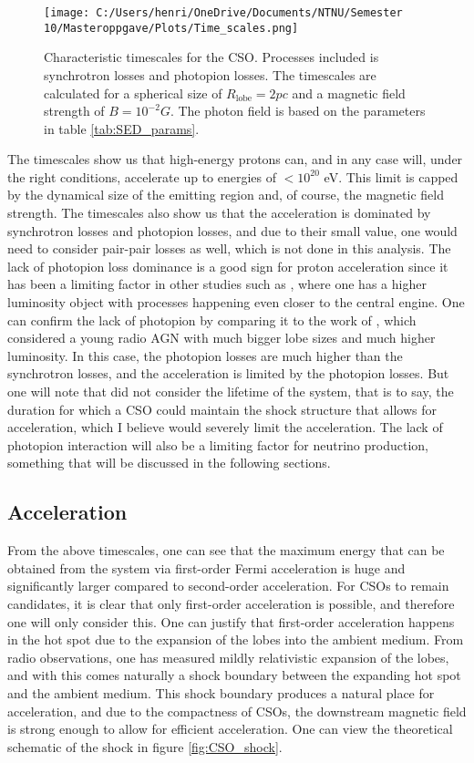 \begin{figure}
    \centering
    \texttt{[image: C:/Users/henri/OneDrive/Documents/NTNU/Semester 10/Masteroppgave/Plots/Time\_scales.png]}
    \caption{Characteristic timescales for the CSO. Processes included is synchrotron losses and photopion losses. The timescales are calculated for a spherical size of $R_{\text{lobe}} = 2 pc$ and a magnetic field strength of $B = 10^{-2} G$. The photon field is based on the parameters in table \ref{tab:SED_params}.}
    \label{fig:timescales}
\end{figure}
The timescales show us that high-energy protons can, and in any case will, under the right conditions, accelerate up to energies of $<10^{20}$ eV. This limit is capped by the dynamical size of the emitting region and, of course, the magnetic field strength. The timescales also show us that the acceleration is dominated by synchrotron losses and photopion losses, and due to their small value, one would need to consider pair-pair losses as well, which is not done in this analysis. The lack of photopion loss dominance is a good sign for proton acceleration since it has been a limiting factor in other studies such as \cite{peretti2023diffusive}, where one has a higher luminosity object with processes happening even closer to the central engine. One can confirm the lack of photopion by comparing it to the work of \cite{TAKAMI2011749}, which considered a young radio AGN with much bigger lobe sizes and much higher luminosity. In this case, the photopion losses are much higher than the synchrotron losses, and the acceleration is limited by the photopion losses. But one will note that \cite{TAKAMI2011749} did not consider the lifetime of the system, that is to say, the duration for which a CSO could maintain the shock structure that allows for acceleration, which I believe would severely limit the acceleration. The lack of photopion interaction will also be a limiting factor for neutrino production, something that will be discussed in the following sections.


\subsection*{Acceleration}
From the above timescales, one can see that the maximum energy that can be obtained from the system via first-order Fermi acceleration is huge and significantly larger compared to second-order acceleration. For CSOs to remain candidates, it is clear that only first-order acceleration is possible, and therefore one will only consider this. One can justify that first-order acceleration happens in the hot spot due to the expansion of the lobes into the ambient medium. From radio observations, one has measured mildly relativistic expansion of the lobes, and with this comes naturally a shock boundary between the expanding hot spot and the ambient medium. This shock boundary produces a natural place for acceleration, and due to the compactness of CSOs, the downstream magnetic field is strong enough to allow for efficient acceleration. One can view the theoretical schematic of the shock in figure \ref{fig:CSO_shock}.

